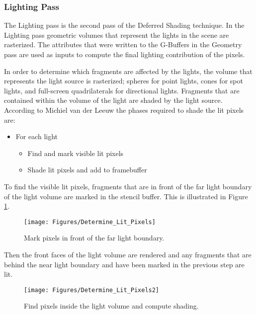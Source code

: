 \subsubsection{Lighting Pass}

The Lighting pass is the second pass of the Deferred Shading technique. In the Lighting pass geometric volumes that represent the lights in the scene are rasterized. The attributes that were written to the G-Buffers in the Geometry pass are used as inputs to compute the final lighting contribution of the pixels.

In order to determine which fragments are affected by the lights, the volume that represents the light source is rasterized; spheres for point lights, cones for spot lights, and full-screen quadrilaterals for directional lights. Fragments that are contained within the volume of the light are shaded by the light source. According to Michiel van der Leeuw \parencite{10_vanderleeuw_2007} the phases required to shade the lit pixels are:

\begin{itemize}
\item{For each light}
\begin{itemize}
\item{Find and mark visible lit pixels}
\item{Shade lit pixels and add to framebuffer}
\end{itemize}
\end{itemize}

To find the visible lit pixels, fragments that are in front of the far light boundary of the light volume are marked in the stencil buffer. This is illustrated in Figure \ref{fig:Determine_Lit_Pixels}.

\begin{figure}[H]
\centering
\texttt{[image: Figures/Determine\_Lit\_Pixels]}
\decoRule
\caption{Mark pixels in front of the far light boundary.}
\label{fig:Determine_Lit_Pixels}
\end{figure}

Then the front faces of the light volume are rendered and any fragments that are behind the near light boundary and have been marked in the previous step are lit.

\begin{figure}[H]
\centering
\texttt{[image: Figures/Determine\_Lit\_Pixels2]}
\decoRule
\caption{Find pixels inside the light volume and compute shading.}
\label{fig:Determine_Lit_Pixels2}
\end{figure}

